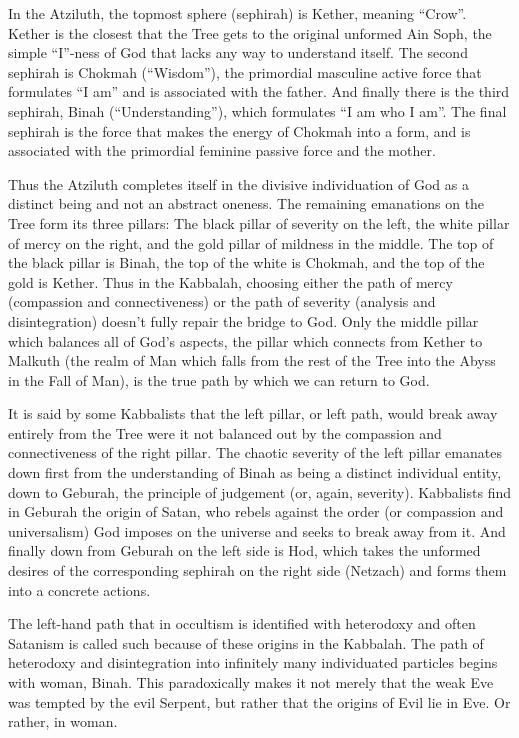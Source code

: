 \documentclass[10pt, statementpaper, twoside, openright]{memoir}
\begin{document}
In the Atziluth, the topmost sphere (sephirah) is Kether, meaning ``Crow''. Kether is the closest that the Tree gets to the original unformed Ain Soph, the simple ``I''-ness of God that lacks any way to understand itself. The second sephirah is Chokmah (``Wisdom''), the primordial masculine active force that formulates ``I am'' and is associated with the father. And finally there is the third sephirah, Binah (``Understanding''), which formulates ``I am who I am''. The final sephirah is the force that makes the energy of Chokmah into a form, and is associated with the primordial feminine passive force and the mother.

Thus the Atziluth completes itself in the divisive individuation of God as a distinct being and not an abstract oneness. The remaining emanations on the Tree form its three pillars: The black pillar of severity on the left, the white pillar of mercy on the right, and the gold pillar of mildness in the middle. The top of the black pillar is Binah, the top of the white is Chokmah, and the top of the gold is Kether. Thus in the Kabbalah, choosing either the path of mercy (compassion and connectiveness) or the path of severity (analysis and disintegration) doesn't fully repair the bridge to God. Only the middle pillar which balances all of God's aspects, the pillar which connects from Kether to Malkuth (the realm of Man which falls from the rest of the Tree into the Abyss in the Fall of Man), is the true path by which we can return to God.

%

It is said by some Kabbalists that the left pillar, or left path, would break away entirely from the Tree were it not balanced out by the compassion and connectiveness of the right pillar. The chaotic severity of the left pillar emanates down first from the understanding of Binah as being a distinct individual entity, down to Geburah, the principle of judgement (or, again, severity). Kabbalists find in Geburah the origin of Satan, who rebels against the order (or compassion and universalism) God imposes on the universe and seeks to break away from it. And finally down from Geburah on the left side is Hod, which takes the unformed desires of the corresponding sephirah on the right side (Netzach) and forms them into a concrete actions.

The left-hand path that in occultism is identified with heterodoxy and often Satanism is called such because of these origins in the Kabbalah. The path of heterodoxy and disintegration into infinitely many individuated particles begins with woman, Binah. This paradoxically makes it not merely that the weak Eve was tempted by the evil Serpent, but rather that the origins of Evil lie in Eve. Or rather, in woman.
\end{document}
